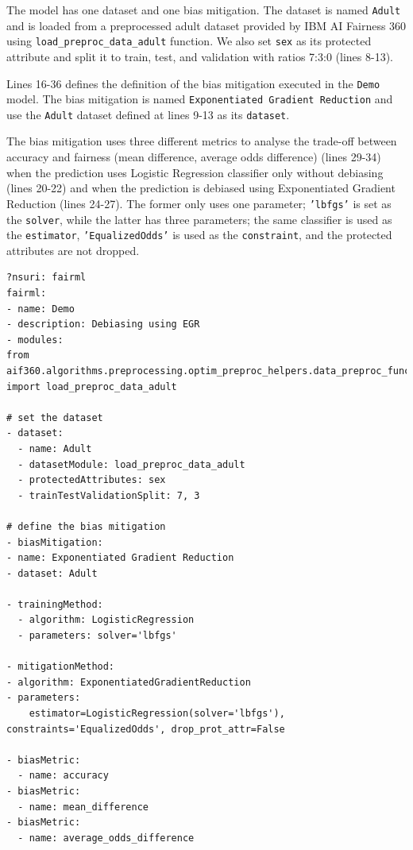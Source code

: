 \documentclass[sigconf,review]{acmart}
\begin{document}
The model has one dataset and one bias mitigation. The dataset is named \texttt{Adult} and is loaded from a preprocessed adult dataset provided by IBM AI Fairness 360 using \texttt{load\_preproc\_data\_adult} function. We also set \texttt{sex} as its protected attribute and split it to train, test, and validation with ratios 7:3:0 (lines 8-13). 

Lines 16-36 defines the definition of the bias mitigation executed in the \texttt{Demo} model. The bias mitigation is named \texttt{Exponentiated Gradient Reduction} and use the \texttt{Adult} dataset defined at lines 9-13 as its \texttt{dataset}. 

The bias mitigation uses three different metrics to analyse the trade-off between accuracy and fairness (mean difference, average odds difference) (lines 29-34) when the prediction uses Logistic Regression classifier only without debiasing (lines 20-22) and when the prediction is debiased using Exponentiated Gradient Reduction (lines 24-27). The former only uses one parameter; \texttt{'lbfgs'} is set as the \texttt{solver}, while the latter has three parameters; the same classifier is used as the \texttt{estimator}, \texttt{'EqualizedOdds'} is used as the \texttt{constraint}, and the protected attributes are not dropped.

\begin{lstlisting}[firstnumber=1,style=yaml,caption={Bias mitigation using  Demo Exponentiated Gradient Reduction  expressed in YAML.},label=lst:fairml_model]
?nsuri: fairml
fairml:
- name: Demo
- description: Debiasing using EGR
- modules: 
from aif360.algorithms.preprocessing.optim_preproc_helpers.data_preproc_functions import load_preproc_data_adult

# set the dataset
- dataset:
  - name: Adult
  - datasetModule: load_preproc_data_adult
  - protectedAttributes: sex
  - trainTestValidationSplit: 7, 3

# define the bias mitigation
- biasMitigation:
- name: Exponentiated Gradient Reduction  
- dataset: Adult

- trainingMethod:
  - algorithm: LogisticRegression
  - parameters: solver='lbfgs'

- mitigationMethod:
- algorithm: ExponentiatedGradientReduction
- parameters: 
    estimator=LogisticRegression(solver='lbfgs'), constraints='EqualizedOdds', drop_prot_attr=False

- biasMetric:
  - name: accuracy
- biasMetric:
  - name: mean_difference
- biasMetric:
  - name: average_odds_difference
\end{lstlisting}
\end{document}
